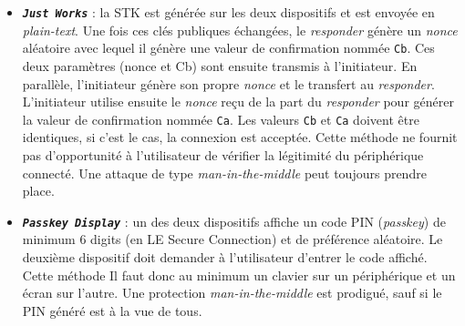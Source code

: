 \begin{itemize}
    \item \texttt{\textit{\textbf{Just Works}}} : la STK est générée sur les deux dispositifs et est envoyée en \textit{plain-text}. Une fois ces clés publiques échangées, le \textit{responder} génère un \textit{nonce} aléatoire avec lequel il génère une valeur de confirmation nommée \texttt{Cb}. Ces deux paramètres (nonce et Cb) sont ensuite transmis à l'initiateur. En parallèle, l'initiateur génère son propre \textit{nonce} et le transfert au \textit{responder}. L'initiateur utilise ensuite le \textit{nonce} reçu de la part du \textit{responder} pour générer la valeur de confirmation nommée \texttt{Ca}. Les valeurs \texttt{Cb} et \texttt{Ca} doivent être identiques, si c'est le cas, la connexion est acceptée\cite{ble_basic_intro:online}.
    Cette méthode ne fournit pas d'opportunité à l'utilisateur de vérifier la légitimité du périphérique connecté. Une attaque de type \textit{man-in-the-middle} peut toujours prendre place\cite{microchip_ble_security:online}.
    



    \item \texttt{\textit{\textbf{Passkey Display}}} : un des deux dispositifs affiche un code PIN (\textit{passkey}) de minimum 6 digits (en LE Secure Connection) et de préférence aléatoire. Le deuxième dispositif doit demander à l'utilisateur d'entrer le code affiché. Cette méthode Il faut donc au minimum un clavier sur un périphérique et un écran sur l'autre. Une protection \textit{man-in-the-middle} est prodigué, sauf si le PIN généré est à la vue de tous.
  

\end{itemize}
